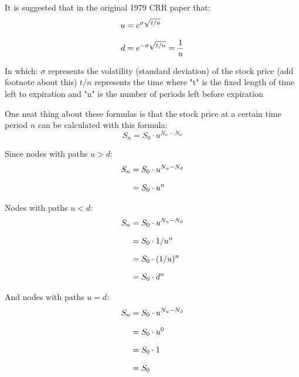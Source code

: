 \documentclass[12pt, letterpaper]{article}
\begin{document}
It is suggested that in the original 1979 CRR paper that:
\begin{equation*}
  \setlength{\jot}{10pt}
  \begin{split}
    u
    & = e^{\sigma\sqrt{t/n}}
    \\
    d
    & = e^{-\sigma\sqrt{t/n}} = \frac{1}{u}
  \end{split}
\end{equation*}

In which:
${\sigma}$ represents the volatility (standard deviation) of the stock price (add footnote about this) %
${t/n}$ represents the time where "t" is the fixed length of time left to expiration and "n" is the number of periods left before expiration

One neat thing about these formulas is that the stock price at a certain time period ${n}$ can be calculated with this formula:
\begin{equation*}
  {S}_n = {S}_0 \cdot {u}^{N_u-N_d}
\end{equation*}

Since nodes with paths ${u > d}$:
\begin{equation*}
  \setlength{\jot}{10pt}
  \begin{split}
    {S}_n
    & = {S}_0 \cdot {u}^{N_u-N_d}
    \\
    & = {S}_0 \cdot {u}^n
  \end{split}
\end{equation*}

Nodes with paths ${u < d}$:
\begin{equation*}
  \setlength{\jot}{10pt}
  \begin{split}
    {S}_n
    & = {S}_0 \cdot {u}^{N_u-N_d}
    \\
    & = {S}_0 \cdot {1/u^n}
    \\
    & = {S}_0 \cdot ({1/u})^n
    \\
    & = {S}_0 \cdot {d^n}
  \end{split}
\end{equation*}

And nodes with paths ${u = d}$:
\begin{equation*}
  \setlength{\jot}{10pt}
  \begin{split}
    {S}_n
    & = {S}_0 \cdot {u}^{N_u-N_d}
    \\
    & = {S}_0 \cdot {u^0}
    \\
    & = {S}_0 \cdot 1
    \\
    & = {S}_0
  \end{split}
\end{equation*}
\end{document}
